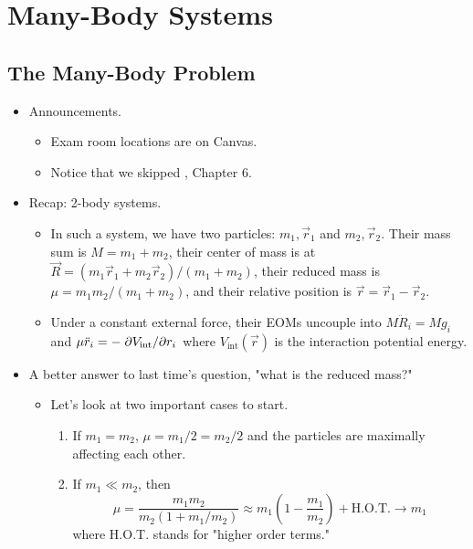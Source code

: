 \documentclass[../notes.tex]{subfiles}
\begin{document}
\chapter{Many-Body Systems}
\section{The Many-Body Problem}
\begin{itemize}
    \item {}Announcements.
    \begin{itemize}
        \item Exam room locations are on Canvas.
        \item Notice that we skipped \textcite{bib:KibbleBerkshire}, Chapter 6.
    \end{itemize}
    \item Recap: 2-body systems.
    \begin{itemize}
        \item In such a system, we have two particles: $m_1,\vec{r}_1$ and $m_2,\vec{r}_2$. Their mass sum is $M=m_1+m_2$, their center of mass is at $\vec{R}=(m_1\vec{r}_1+m_2\vec{r}_2)/(m_1+m_2)$, their reduced mass is $\mu=m_1m_2/(m_1+m_2)$, and their relative position is $\vec{r}=\vec{r}_1-\vec{r}_2$.
        \item Under a constant external force, their EOMs uncouple into $M\ddot{R}_i=Mg_i$ and $\mu\ddot{r}_i=-\pdv*{V_\text{int}}{r_i}$ where $V_\text{int}(\vec{r})$ is the interaction potential energy.
    \end{itemize}
    \item A better answer to last time's question, "what is the reduced mass?"
    \begin{itemize}
        \item Let's look at two important cases to start.
        \begin{enumerate}
            \item If $m_1=m_2$, $\mu=m_1/2=m_2/2$ and the particles are maximally affecting each other.
            \item If $m_1\ll m_2$, then
            \begin{equation*}
                \mu = \frac{m_1m_2}{m_2(1+m_1/m_2)}
                \approx m_1\left( 1-\frac{m_1}{m_2} \right)+\text{H.O.T.}
                \to m_1
            \end{equation*}
            where H.O.T. stands for "higher order terms."
        \end{enumerate}

\end{itemize}
\end{itemize}
\end{document}
